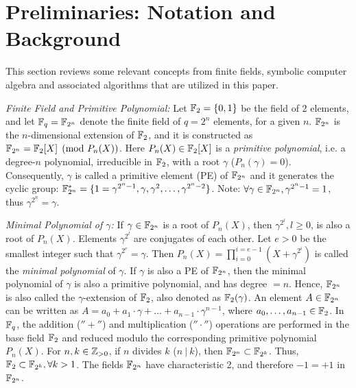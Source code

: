 \section{Preliminaries: Notation and Background}\label{sec:prelim}
This section reviews some relevant concepts from finite fields, 
symbolic computer algebra and associated algorithms that are utilized in this paper. 

{\it Finite Field and Primitive Polynomial:}
Let ${\mathbb{F}}_2=\{0,1\}$ be the field of 2 elements, and let ${\mathbb{F}}_q =
{\mathbb{F}}_{2^n}$ denote the finite 
field of $q=2^n$ elements, for a given $n$. ${\mathbb{F}}_{2^n}$ is the
$n$-dimensional extension of ${\mathbb{F}}_2$, and it is constructed as ${\mathbb{F}}_{2^n} =
{\mathbb{F}}_2[X]\pmod{ P_n(X)}$. Here $P_n(X) \in {\mathbb{F}}_2[X]$ is a {\it primitive
  polynomial}, i.e. a degree-$n$ polynomial, irreducible in
${\mathbb{F}}_2$, with a root $\gamma$ ($P_n(\gamma)=0$). 
Consequently, $\gamma$ is called a primitive element (PE) of ${\mathbb{F}}_{2^n}$ and
it generates the cyclic group: ${\mathbb{F}}_{2^n}^*=\{1=\gamma^{2^n - 1}, \gamma,
\gamma^2,\dots,\gamma^{2^n - 2}\}$. Note: $\forall \gamma\in {\mathbb{F}}_{2^n},
\gamma^{2^n-1}=1$, thus $\gamma^{2^n}=\gamma$.

{\it Minimal Polynomial of $\gamma$:} If $\gamma \in {\mathbb{F}}_{2^n}$ is a root
of $P_n(X)$, then $\gamma^{2^l},l\geq 0$, is also a root of
$P_n(X)$. Elements $\gamma^{2^l}$ are conjugates of each other. Let
$e>0$ be the smallest integer such that $\gamma^{2^e} = \gamma$. Then
$P_n(X)=\prod_{i=0}^{i=e-1}(X+\gamma^{2^i})$ is called the {\it
  minimal polynomial} of $\gamma$. If $\gamma$ is also a PE of ${\mathbb{F}}_{2^n}$,
then the minimal polynomial of $\gamma$ is also a primitive
polynomial, and has degree $=n$. Hence, ${\mathbb{F}}_{2^n}$ is also called the
$\gamma$-extension of ${\mathbb{F}}_2$, also denoted as ${\mathbb{F}}_2(\gamma)$. 
An element $A \in {\mathbb{F}}_{2^n}$ can be written as $A = a_0 + a_1\cdot \gamma +
\dots + a_{n-1}\cdot\gamma^{n-1}$, where $a_0,\dots,a_{n-1} \in
{\mathbb{F}}_2$. 
In ${\mathbb{F}}_{q}$, the addition ($''+''$) and multiplication
($''\cdot''$) operations are performed in the base field ${\mathbb{F}}_2$ and
reduced modulo the corresponding primitive polynomial $P_n(X)$. 
For $n, k \in {\mathbb{Z}}_{> 0}$, if $n$ divides $k$ ($n ~|~ k$), then ${\mathbb{F}}_{2^n} \subset
{\mathbb{F}}_{2^k}$. 
Thus, ${\mathbb{F}}_2 \subset {\mathbb{F}}_{2^k}, \forall k>1$. 
The fields ${\mathbb{F}}_{2^n}$ have
characteristic 2, and therefore $-1 = +1$ in ${\mathbb{F}}_{2^n}$. 


